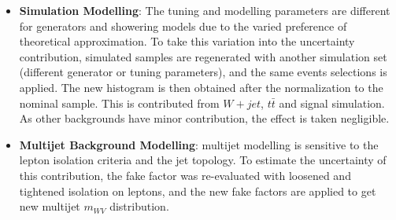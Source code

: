 \begin{itemize}
	\item{\bf Simulation Modelling}: The tuning and modelling parameters are different for generators and showering models due to the varied preference of theoretical approximation. To take this variation into the uncertainty contribution, simulated samples are regenerated with another simulation set (different generator or tuning parameters), and the same events selections is applied. The new histogram is then obtained after the normalization to the nominal sample. This is contributed from $W+jet$, $t\bar{t}$ and signal simulation. As other backgrounds have minor contribution, the effect is taken negligible.

	\item{\bf Multijet Background Modelling}: multijet modelling is sensitive to the lepton isolation criteria and the jet topology. To estimate the uncertainty of this contribution, the fake factor was re-evaluated with loosened and tightened isolation on leptons, and the new fake factors are applied to get new multijet $m_{WV}$ distribution.
\end{itemize}
